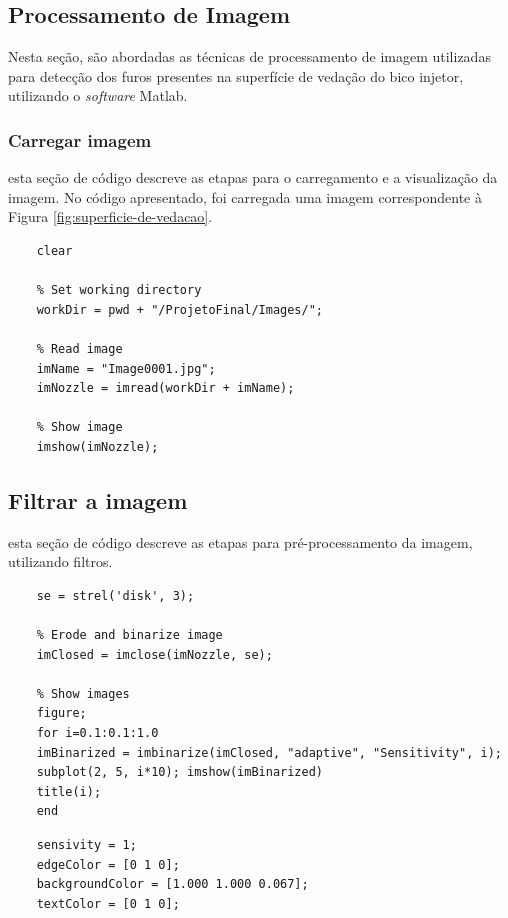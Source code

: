 \documentclass[conference]{IEEEtran}
\begin{document}
\subsection{Processamento de Imagem}

Nesta seção, são abordadas as técnicas de processamento de imagem utilizadas para detecção dos furos presentes na superfície de vedação do bico injetor, utilizando o \textit{software} Matlab.  

\subsubsection{Carregar imagem} esta seção de código descreve as etapas para o carregamento e a visualização da imagem. No código apresentado, foi carregada uma imagem correspondente à Figura \ref{fig:superficie-de-vedacao}. 

\begin{lstlisting}[caption={Carregar e visualizar a imagem}, label={lst:codigo}]
	% Clear workspace
	clear
	
	% Set working directory
	workDir = pwd + "/ProjetoFinal/Images/";
	
	% Read image
	imName = "Image0001.jpg";
	imNozzle = imread(workDir + imName);
	
	% Show image
	imshow(imNozzle);
\end{lstlisting}

\subsection{Filtrar a imagem} esta seção de código descreve as etapas para pré-processamento da imagem, utilizando filtros.

\begin{lstlisting}[caption={Carregar e visualizar a imagem}, label={lst:codigo}]
	% Create structuring element
	se = strel('disk', 3);
	
	% Erode and binarize image
	imClosed = imclose(imNozzle, se);
	
	% Show images
	figure;
	for i=0.1:0.1:1.0
	imBinarized = imbinarize(imClosed, "adaptive", "Sensitivity", i); 
	subplot(2, 5, i*10); imshow(imBinarized)
	title(i);
	end
\end{lstlisting}

\begin{lstlisting}[caption={Código de exemplo em Matlab}, label={lst:codigo}]
	% Select sensivity to segmentation and color to highlight circles
	sensivity = 1;
	edgeColor = [0 1 0];
	backgroundColor = [1.000 1.000 0.067];
	textColor = [0 1 0];
\end{lstlisting}
\end{document}
